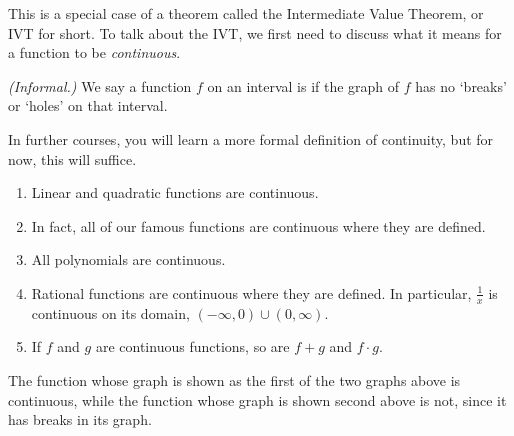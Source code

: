 \documentclass[noauthor, nooutcomes]{ximera}
\begin{document}
This is a special case of a theorem called the Intermediate Value Theorem, or IVT for short. To talk about the IVT, we first need to discuss what it means for a function to be \emph{continuous}. 

\begin{definition}\emph{(Informal.)}
We say a function $f$ on an interval is  if the graph of $f$ has no `breaks' or `holes' on that interval. 
\end{definition}

In further courses, you will learn a more formal definition of continuity, but for now, this will suffice.

\begin{example}
\begin{enumerate}
	\item Linear and quadratic functions are continuous.
	\item In fact, all of our famous functions are continuous where they are defined. 
	\item All polynomials are continuous.
	\item Rational functions are continuous where they are defined. In particular, $\frac{1}{x}$ is continuous on its domain, $(- \infty, 0) \cup (0, \infty)$. 
	\item If $f$ and $g$ are continuous functions, so are $f + g$ and $f \cdot g$. 
\end{enumerate}
\end{example}

\begin{image}
\hspace{10mm}
\end{image}
The function whose graph is shown as the first of the two graphs above is continuous, while the function whose graph is shown second above is not, since it has breaks in its graph.
\end{document}
